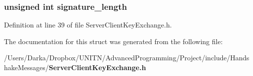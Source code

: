 \subsubsection[{signature\+\_\+length}]{\setlength{\rightskip}{0pt plus 5cm}unsigned int signature\+\_\+length}\label{struct_e_c_d_h_e__server__key__exchange_a23a683d5129246d9adbd0029612d06a8}


Definition at line 39 of file Server\+Client\+Key\+Exchange.\+h.



The documentation for this struct was generated from the following file\+:\begin{DoxyCompactItemize}
\item 
/\+Users/\+Darka/\+Dropbox/\+U\+N\+I\+T\+N/\+Advanced\+Programming/\+Project/include/\+Handshake\+Messages/{\bf Server\+Client\+Key\+Exchange.\+h}\end{DoxyCompactItemize}
